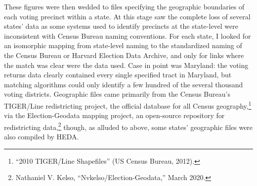 \documentclass[12pt,oneside]{psthesis}
\begin{document}
These figures were then wedded to files specifying the geographic boundaries of each voting precinct within a state.
At this stage saw the complete loss of several states' data as some systems used to identify precincts at the state-level were inconsistent with Census Bureau naming conventions.
For each state, I looked for an isomorphic mapping from state-level naming to the standardized naming of the Census Bureau or Harvard Election Data Archive, and only for links where the match was clear were the data used.
Case in point was Maryland: the voting returns data clearly contained every single specified tract in Maryland, but matching algorithms could only identify a few hundred of the several thousand voting districts.
Geographic files came primarily from the Census Bureau's TIGER/Line redistricting project, the official database for all Census geography,\footnote{``2010 TIGER/Line Shapefiles'' (US Census Bureau, 2012).} via the Election-Geodata mapping project, an open-source repository for redistricting data,\footnote{Nathaniel V. Kelso, ``Nvkelso/Election-Geodata,'' March 2020.} though, as alluded to above, some states' geographic files were also compiled by HEDA.
\end{document}
